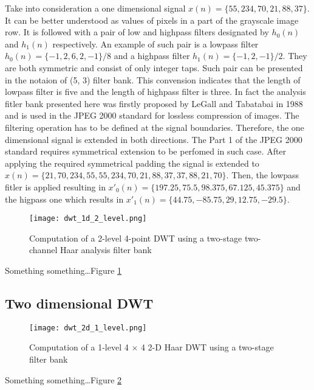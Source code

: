Take into consideration a one dimensional signal $x(n) = \{55, 234, 70, 21, 88, 37\}$. It can be better
understood as values of pixels in a part of the grayscale image row. It is followed with a pair of low
and highpass filters designated by $h_{0}(n)$ and $h_{1}(n)$ respectively. An example of such pair is
a lowpass filter $h_{0}(n) = \{-1, 2, 6, 2, -1\}/8$ and a highpass filter $h_{1}(n) = \{-1, 2, -1\}/2$. They are both
symmetric and consist of only integer taps. Such pair can be presented in the notaion of (5, 3) filter bank.
This convension indicates that the length of lowpass filter is five and the length of highpass filter is three.
In fact the analysis fitler bank presented here was firstly proposed by LeGall and Tabatabai in 1988 and
is used in the JPEG 2000 standard for lossless compression of images. The filtering operation has to
be defined at the signal boundaries. Therefore, the one dimensional signal is extended in both directions.
The Part 1 of the JPEG 2000 standard requires symmetrical extension to be perfomed in such case. \cite{jpeg_suite}
After applying the required symmetrical padding the signal is extended to
$x(n) = \{21, 70, 234, 55, 55, 234, 70, 21, 88, 37, 37, 88, 21, 70\}$. Then, the lowpass fitler is applied
resulting in $x'_{0}(n) = \{197.25, 75.5, 98.375, 67.125, 45.375\}$ and the higpass one which results in
$x'_{1}(n) = \{44.75, -85.75, 29, 12.75, -29.5\}$.

\begin{figure}
    \centering
    \texttt{[image: dwt\_1d\_2\_level.png]}
    \caption{Computation of a 2-level 4-point DWT using a two-stage two-channel Haar analysis filter bank \cite{dwt_impl}}
    \label{fig:dwt_1d_2_level}
\end{figure}

Something something\dots Figure \ref{fig:dwt_1d_2_level} \cite{dwt_impl}

\subsection{Two dimensional DWT}

\begin{figure}
    \centering
    \texttt{[image: dwt\_2d\_1\_level.png]}
    \caption{Computation of a 1-level 4 $\times$ 4 2-D Haar DWT using a two-stage filter bank \cite{dwt_impl}}
    \label{fig:dwt_2d_1_level}
\end{figure}

Something something\dots Figure \ref{fig:dwt_2d_1_level} \cite{dwt_impl}

